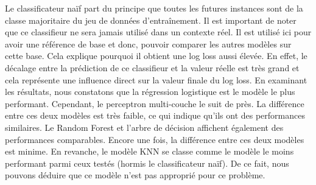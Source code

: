 \documentclass[12pt]{article}
\begin{document}
Le classificateur naïf part du principe que toutes les futures instances sont de la classe majoritaire du jeu de données d'entraînement.
Il est important de noter que ce classifieur ne sera jamais utilisé dans un contexte réel.
Il est utilisé ici pour avoir une référence de base et donc, pouvoir comparer les autres modèles sur cette base.
Cela explique pourquoi il obtient une log loss aussi élevée.
En effet, le décalage entre la prédiction de ce classifieur et la valeur réelle est très grand et cela représente une influence direct sur la valeur finale du log loss.
\newline\newline
En examinant les résultats, nous constatons que la régression logistique est le modèle le plus performant.
Cependant, le perceptron multi-couche le suit de près.
La différence entre ces deux modèles est très faible, ce qui indique qu'ils ont des performances similaires.
\newline\newline
Le Random Forest et l'arbre de décision affichent également des performances comparables.
Encore une fois, la différence entre ces deux modèles est minime.
\newline\newline
En revanche, le modèle KNN se classe comme le modèle le moins performant parmi ceux testés (hormis le classificateur naïf).
De ce fait, nous pouvons déduire que ce modèle n'est pas approprié pour ce problème.
\end{document}
